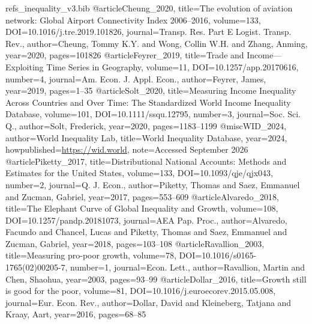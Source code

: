 \begin{filecontents*}[overwrite]{refs_inequality_v3.bib}
@article{Cheung_2020, title={The evolution of aviation network: {Global Airport Connectivity Index} 2006--2016}, volume={133}, DOI={10.1016/j.tre.2019.101826}, journal={Transp. Res. Part E Logist. Transp. Rev.}, author={Cheung, Tommy K.Y. and Wong, Collin W.H. and Zhang, Anming}, year={2020}, pages={101826} }
@article{Feyrer_2019, title={Trade and Income---{Exploiting} Time Series in Geography}, volume={11}, DOI={10.1257/app.20170616}, number={4}, journal={Am. Econ. J. Appl. Econ.}, author={Feyrer, James}, year={2019}, pages={1--35} }
@article{Solt_2020, title={Measuring Income Inequality Across Countries and Over Time: The {Standardized World Income Inequality Database}}, volume={101}, DOI={10.1111/ssqu.12795}, number={3}, journal={Soc. Sci. Q.}, author={Solt, Frederick}, year={2020}, pages={1183--1199} }
@misc{WID_2024, author={{World Inequality Lab}}, title={World Inequality Database}, year={2024}, howpublished={\url{https://wid.world}}, note={Accessed September 2026} }
@article{Piketty_2017, title={Distributional National Accounts: Methods and Estimates for the {United States}}, volume={133}, DOI={10.1093/qje/qjx043}, number={2}, journal={Q. J. Econ.}, author={Piketty, Thomas and Saez, Emmanuel and Zucman, Gabriel}, year={2017}, pages={553--609} }
@article{Alvaredo_2018, title={The Elephant Curve of Global Inequality and Growth}, volume={108}, DOI={10.1257/pandp.20181073}, journal={AEA Pap. Proc.}, author={Alvaredo, Facundo and Chancel, Lucas and Piketty, Thomas and Saez, Emmanuel and Zucman, Gabriel}, year={2018}, pages={103--108} }
@article{Ravallion_2003, title={Measuring pro-poor growth}, volume={78}, DOI={10.1016/s0165-1765(02)00205-7}, number={1}, journal={Econ. Lett.}, author={Ravallion, Martin and Chen, Shaohua}, year={2003}, pages={93--99} }
@article{Dollar_2016, title={Growth still is good for the poor}, volume={81}, DOI={10.1016/j.euroecorev.2015.05.008}, journal={Eur. Econ. Rev.}, author={Dollar, David and Kleineberg, Tatjana and Kraay, Aart}, year={2016}, pages={68--85} }

\end{filecontents*}
